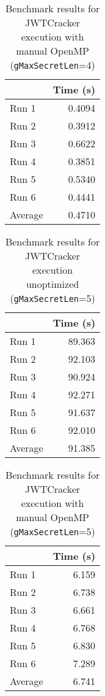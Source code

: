 \documentclass[12pt]{article}
\begin{document}
\begin{table}[H]
  \centering
  \begin{tabular}{lr}
    & {\bf Time (s)} \\
    \hline
    Run 1 & 0.4094 \\
    Run 2 & 0.3912 \\
    Run 3 & 0.6622 \\
    Run 4 & 0.3851 \\
    Run 5 & 0.5340 \\
    Run 6 & 0.4441 \\
    \hline
    Average & 0.4710 \\
  \end{tabular}
  \caption{Benchmark results for JWTCracker execution with manual OpenMP ({\tt gMaxSecretLen}=4)}
  \label{tbl-zeta-openmp}
\end{table}

\begin{table}[H]
  \centering
  \begin{tabular}{lr}
    & {\bf Time (s)} \\
    \hline
    Run 1 & 89.363 \\
    Run 2 & 92.103 \\
    Run 3 & 90.924 \\
    Run 4 & 92.271 \\
    Run 5 & 91.637 \\
    Run 6 & 92.010 \\
    \hline
    Average & 91.385 \\
  \end{tabular}
  \caption{Benchmark results for JWTCracker execution unoptimized ({\tt gMaxSecretLen}=5)}
  \label{tbl-zeta-openmp}
\end{table}

\begin{table}[H]
  \centering
  \begin{tabular}{lr}
    & {\bf Time (s)} \\
    \hline
    Run 1 & 6.159 \\
    Run 2 & 6.738  \\
    Run 3 & 6.661 \\
    Run 4 & 6.768 \\
    Run 5 & 6.830 \\
    Run 6 & 7.289 \\
    \hline
    Average & 6.741 \\
  \end{tabular}
  \caption{Benchmark results for JWTCracker execution with manual OpenMP ({\tt gMaxSecretLen}=5)}
  \label{tbl-zeta-openmp}
\end{table}
\end{document}
